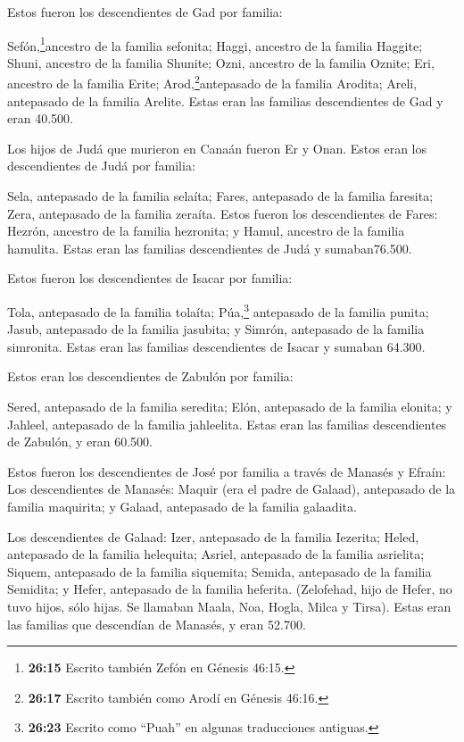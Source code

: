  Estos fueron los descendientes de Gad por familia:

Sefón,\footnote{\textbf{26:15} Escrito también Zefón en Génesis 46:15.}ancestro
de la familia sefonita; Haggi, ancestro de la familia Haggite; Shuni,
ancestro de la familia Shunite;  Ozni, ancestro de la
familia Oznite; Eri, ancestro de la familia Erite; 
Arod,\footnote{\textbf{26:17} Escrito también como Arodí en Génesis
  46:16.}antepasado de la familia Arodita; Areli, antepasado de la
familia Arelite.  Estas eran las familias descendientes de
Gad y eran 40.500.

 Los hijos de Judá que murieron en Canaán fueron Er y Onan.
Estos eran los descendientes de Judá por familia:

 Sela, antepasado de la familia selaíta; Fares, antepasado
de la familia faresita; Zera, antepasado de la familia zeraíta.
 Estos fueron los descendientes de Fares: Hezrón, ancestro
de la familia hezronita; y Hamul, ancestro de la familia hamulita.
 Estas eran las familias descendientes de Judá y
sumaban76.500.

 Estos fueron los descendientes de Isacar por familia:

Tola, antepasado de la familia tolaíta; Púa,\footnote{\textbf{26:23}
  Escrito como ``Puah'' en algunas traducciones antiguas.} antepasado de
la familia punita;  Jasub, antepasado de la familia
jasubita; y Simrón, antepasado de la familia simronita. 
Estas eran las familias descendientes de Isacar y sumaban 64.300.

 Estos eran los descendientes de Zabulón por familia:

Sered, antepasado de la familia seredita; Elón, antepasado de la familia
elonita; y Jahleel, antepasado de la familia jahleelita. 
Estas eran las familias descendientes de Zabulón, y eran 60.500.

 Estos fueron los descendientes de José por familia a
través de Manasés y Efraín:  Los descendientes de Manasés:
Maquir (era el padre de Galaad), antepasado de la familia maquirita; y
Galaad, antepasado de la familia galaadita.

 Los descendientes de Galaad: Izer, antepasado de la
familia Iezerita; Heled, antepasado de la familia helequita;
 Asriel, antepasado de la familia asrielita; Siquem,
antepasado de la familia siquemita;  Semida, antepasado de
la familia Semidita; y Hefer, antepasado de la familia heferita.
 (Zelofehad, hijo de Hefer, no tuvo hijos, sólo hijas. Se
llamaban Maala, Noa, Hogla, Milca y Tirsa).  Estas eran las
familias que descendían de Manasés, y eran 52.700.

